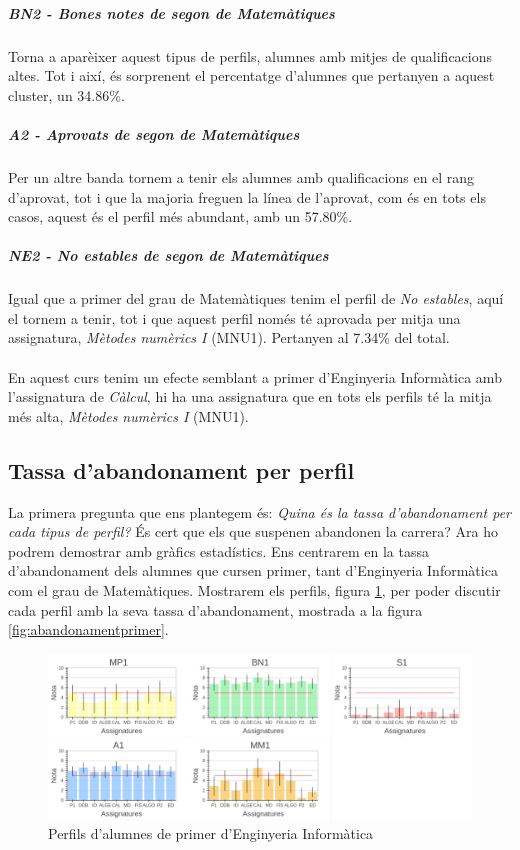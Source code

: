 \documentclass[12pt,a4paper,catalan]{article}
\begin{document}
\newpage

\subparagraph{BN2 - Bones notes de segon de Matemàtiques}
Torna a aparèixer aquest tipus de perfils, alumnes amb mitjes de qualificacions altes. Tot i així, és sorprenent el percentatge d'alumnes que pertanyen a aquest cluster, un 34.86\%.

\subparagraph{A2 - Aprovats de segon de Matemàtiques}
Per un altre banda tornem a tenir els alumnes amb qualificacions en el rang d'aprovat, tot i que la majoria freguen la línea de l'aprovat, com és en tots els casos, aquest és el perfil més abundant, amb un 57.80\%.

\subparagraph{NE2 - No estables de segon de Matemàtiques}
Igual que a primer del grau de Matemàtiques tenim el perfil de \textit{No estables}, aquí el tornem a tenir, tot i que aquest perfil només té aprovada per mitja una assignatura, \textit{Mètodes numèrics I} (MNU1). Pertanyen al 7.34\% del total.
\\
\\
En aquest curs tenim un efecte semblant a primer d'Enginyeria Informàtica amb l'assignatura de \textit{Càlcul}, hi ha una assignatura que en tots els perfils té la mitja més alta, \textit{Mètodes numèrics I} (MNU1).

\newpage

\subsection{Tassa d'abandonament per perfil}
La primera pregunta que ens plantegem és: \textit{Quina és la tassa d'abandonament per cada tipus de perfil?} És cert que els que suspenen abandonen la carrera? Ara ho podrem demostrar amb gràfics estadístics. Ens centrarem en la tassa d'abandonament dels alumnes que cursen primer, tant d'Enginyeria Informàtica com el grau de Matemàtiques. Mostrarem els perfils, figura \ref{fig:tap}, per poder discutir cada perfil amb la seva tassa d'abandonament, mostrada a la figura \ref{fig:abandonamentprimer}.

\begin{figure}[h]
\centering
\includegraphics[width=\linewidth]{img/perfils_primer_info.png}
\caption{Perfils d'alumnes de primer d'Enginyeria Informàtica}
\label{fig:tap}
\end{figure}
\end{document}
